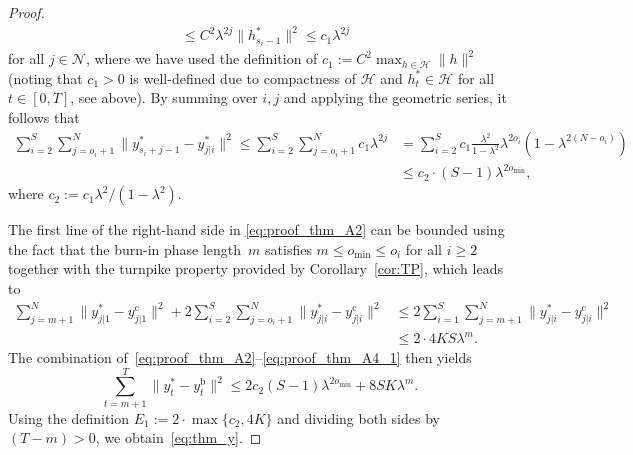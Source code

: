 \documentclass{article} %
\begin{document}
\begin{proof}
\begin{align*}
		&\leq C^2\lambda^{2j}\|h_{s_i-1}^*\|^2 \leq c_1\lambda^{2j}
	\end{align*}	
	for all $j\in\mathcal{N}$, where we have used the definition of $c_1 := C^2\max_{h\in\mathcal{H}}\|h\|^2$ (noting that $c_1>0$ is well-defined due to compactness of $\mathcal{H}$ and $h^*_t\in\mathcal{H}$ for all $t\in[0,T]$, see above).
	By summing over $i,j$ and applying the geometric series, it follows that 
	\begin{align}
		\sum_{i=2}^{S}\sum_{j=o_i+1}^{N}\|y^*_{s_i+j-1}-y_{j|i}^*\|^2
		\leq \sum_{i=2}^{S}\sum_{j=o_i+1}^{N}c_1\lambda^{2j}
		&= \sum_{i=2}^{S}c_1
		\frac{\lambda^2}{1-\lambda^2}\lambda^{2o_i}\left(1-\lambda^{2(N-o_i)}\right)\nonumber \\
		&\leq c_2 \cdot (S-1)\lambda^{2o_{\min}},\label{eq:proof_thm_A3_1}
	\end{align}
	where $c_2 := {c_1\lambda^2}/({1-\lambda^2})$.
	
	The first line of the right-hand side in \eqref{eq:proof_thm_A2} can be bounded using the fact that the burn-in phase length~$m$ satisfies $m\leq o_{\min} \leq o_i$ for all $i\geq2$ together with the turnpike property provided by Corollary~\ref{cor:TP}, which leads to
	\begin{align}
		\sum_{j=m+1}^{N}\|y^*_{j|1}-y_{j|1}^\mathrm{c}\|^2 +
		2\sum_{i=2}^{S}\sum_{j=o_i+1}^{N}\|y_{j|i}^*-y^\mathrm{c}_{j|i}\|^2
		&\leq  2\sum_{i=1}^{S}\sum_{j=m+1}^{N}\|y_{j|i}^*-y^\mathrm{c}_{j|i}\|^2\nonumber\\
		&\leq 2\cdot 4KS\lambda^m.\label{eq:proof_thm_A4_1}
	\end{align}
	The combination of~\eqref{eq:proof_thm_A2}--\eqref{eq:proof_thm_A4_1} then yields
	\begin{equation*}
		\sum_{t=m+1}^{T}\|y^*_t-y_t^\mathrm{b}\|^2
		\leq  2c_2(S-1)\lambda^{2o_{\min}} + 8 SK\lambda^m.
	\end{equation*}
	Using the definition $E_1:=2\cdot\max\{c_2,4K\}$ and dividing both sides by $(T-m)>0$, we obtain~\eqref{eq:thm_y}.
	

\end{proof}
\end{document}
